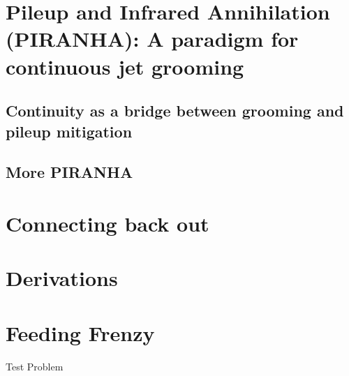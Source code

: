 \section{Pileup and Infrared Annihilation (PIRANHA): A paradigm for continuous jet grooming}

\subsection{Continuity as a bridge between grooming and pileup mitigation}


\subsection{More PIRANHA}

\section{Connecting back out}


\begin{subappendices}

\section{Derivations}


\section{Feeding Frenzy}


\end{subappendices}


\begin{problems}
\begin{problem}
    Test Problem
\end{problem}
\end{problems}
